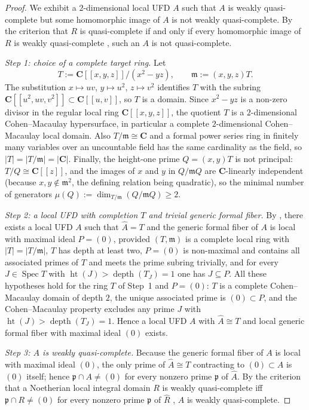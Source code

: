 \documentclass[11pt,reqno]{amsart}
\numberwithin{equation}{section}
\theoremstyle{definition}
\begin{document}
\begin{proof}
We exhibit a $2$-dimensional local UFD $A$ such that $A$ is weakly
quasi-complete but some homomorphic image of $A$ is not weakly
quasi-complete. By the criterion that $R$ is quasi-complete if and only
if every homomorphic image of $R$ is weakly quasi-complete
\cite{Anderson2014-QCRM}, such an $A$ is not quasi-complete.

\smallskip
\noindent\emph{Step 1: choice of a complete target ring.} Let
\[
   T:=\mathbf C[[x,y,z]]/(x^2-yz),\qquad
   \mathfrak m:=(x,y,z)T.
\]
The substitution $x\mapsto uv$, $y\mapsto u^2$, $z\mapsto v^2$
identifies $T$ with the subring $\mathbf C[[u^2,uv,v^2]]\subset
\mathbf C[[u,v]]$, so $T$ is a domain. Since $x^2-yz$ is a non-zero
divisor in the regular local ring $\mathbf C[[x,y,z]]$, the quotient
$T$ is a $2$-dimensional Cohen--Macaulay hypersurface, in particular a
complete $2$-dimensional Cohen--Macaulay local domain. Also
$T/\mathfrak m\cong\mathbf C$ and a formal power series ring in finitely
many variables over an uncountable field has the same cardinality as the
field, so $|T|=|T/\mathfrak m|=|\mathbf C|$. Finally, the height-one
prime $Q=(x,y)T$ is not principal: $T/Q\cong\mathbf C[[z]]$, and the
images of $x$ and $y$ in $Q/\mathfrak m Q$ are $\mathbf C$-linearly
independent (because $x,y\notin\mathfrak m^2$, the defining relation
being quadratic), so the minimal number of generators
$\mu(Q):=\dim_{T/\mathfrak m}(Q/\mathfrak m Q)\ge 2$.

\smallskip
\noindent\emph{Step 2: a local UFD with completion $T$ and trivial generic
formal fiber.} By \cite[Corollary~2.4]{Jensen2006-UFD}, there exists a
local UFD $A$ such that $\widehat A=T$ and the generic formal fiber of
$A$ is local with maximal ideal $P=(0)$, provided $(T,\mathfrak m)$ is
a complete local ring with $|T|=|T/\mathfrak m|$, $T$ has depth at least
two, $P=(0)$ is non-maximal and contains all associated primes of $T$
and meets the prime subring trivially, and for every
$J\in\operatorname{Spec}T$ with $\operatorname{ht}(J)>\operatorname{depth}(T_J)=1$ one
has $J\subseteq P$. All these hypotheses hold for the ring $T$ of Step~1
and $P=(0)$: $T$ is a complete Cohen--Macaulay domain of depth $2$, the
unique associated prime is $(0)\subset P$, and the Cohen--Macaulay
property excludes any prime $J$ with
$\operatorname{ht}(J)>\operatorname{depth}(T_J)=1$. Hence a local UFD $A$
with $\widehat A\cong T$ and local generic formal fiber with maximal ideal
$(0)$ exists.

\smallskip
\noindent\emph{Step 3: $A$ is weakly quasi-complete.} Because the generic
formal fiber of $A$ is local with maximal ideal $(0)$, the only prime of
$\widehat A\cong T$ contracting to $(0)\subset A$ is $(0)$ itself; hence
$\mathfrak p\cap A\ne(0)$ for every nonzero prime $\mathfrak p$ of
$\widehat A$. By the criterion that a Noetherian local integral domain
$R$ is weakly quasi-complete iff $\mathfrak p\cap R\ne(0)$ for every
nonzero prime $\mathfrak p$ of $\widehat R$
\cite[Proposition~1]{Farley-QCLocalizations}, $A$ is weakly quasi-complete.


\end{proof}
\end{document}
